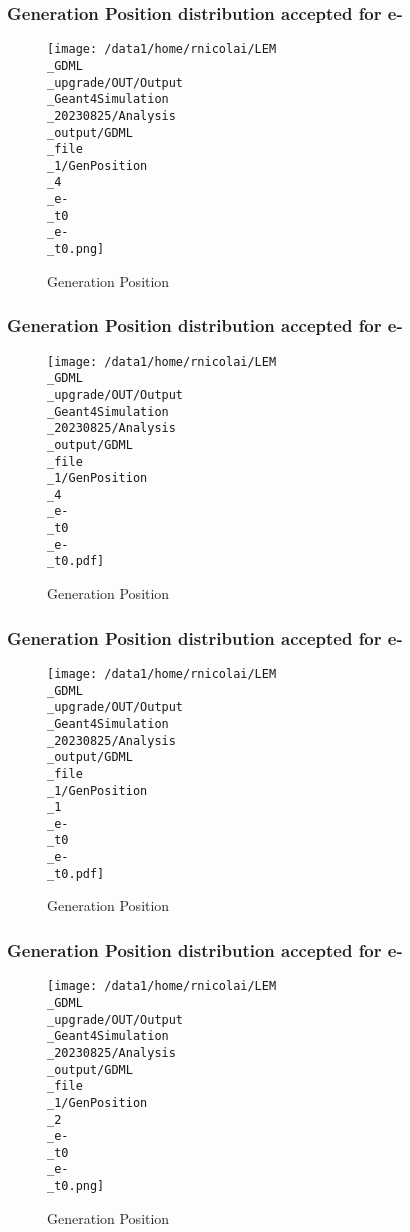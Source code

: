 \documentclass[8pt]{beamer}
\begin{document}
            \begin{frame}
                \frametitle{Generation Position distribution accepted for e-}
            
        \begin{figure}[h]
            \centering
            \texttt{[image: /data1/home/rnicolai/LEM\\\_GDML\\\_upgrade/OUT/Output\\\_Geant4Simulation\\\_20230825/Analysis\\\_output/GDML\\\_file\\\_1/GenPosition\\\_4\\\_e-\\\_t0\\\_e-\\\_t0.png]}
            \caption{Generation Position}
        \end{figure}
        
            \end{frame}
            
            \begin{frame}
                \frametitle{Generation Position distribution accepted for e-}
            
        \begin{figure}[h]
            \centering
            \texttt{[image: /data1/home/rnicolai/LEM\\\_GDML\\\_upgrade/OUT/Output\\\_Geant4Simulation\\\_20230825/Analysis\\\_output/GDML\\\_file\\\_1/GenPosition\\\_4\\\_e-\\\_t0\\\_e-\\\_t0.pdf]}
            \caption{Generation Position}
        \end{figure}
        
            \end{frame}
            
            \begin{frame}
                \frametitle{Generation Position distribution accepted for e-}
            
        \begin{figure}[h]
            \centering
            \texttt{[image: /data1/home/rnicolai/LEM\\\_GDML\\\_upgrade/OUT/Output\\\_Geant4Simulation\\\_20230825/Analysis\\\_output/GDML\\\_file\\\_1/GenPosition\\\_1\\\_e-\\\_t0\\\_e-\\\_t0.pdf]}
            \caption{Generation Position}
        \end{figure}
        
            \end{frame}
            
            \begin{frame}
                \frametitle{Generation Position distribution accepted for e-}
            
        \begin{figure}[h]
            \centering
            \texttt{[image: /data1/home/rnicolai/LEM\\\_GDML\\\_upgrade/OUT/Output\\\_Geant4Simulation\\\_20230825/Analysis\\\_output/GDML\\\_file\\\_1/GenPosition\\\_2\\\_e-\\\_t0\\\_e-\\\_t0.png]}
            \caption{Generation Position}
        \end{figure}
        
            \end{frame}
            
\end{document}
